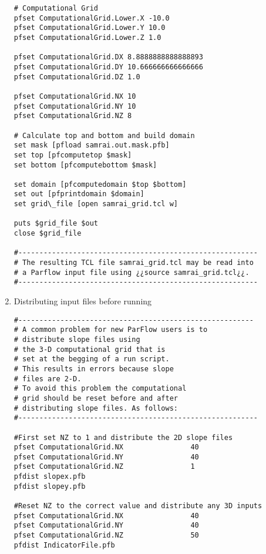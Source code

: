 \begin{enumerate}
\begin{display}
\begin{verbatim}
# Computational Grid
pfset ComputationalGrid.Lower.X -10.0
pfset ComputationalGrid.Lower.Y 10.0
pfset ComputationalGrid.Lower.Z 1.0

pfset ComputationalGrid.DX 8.8888888888888893
pfset ComputationalGrid.DY 10.666666666666666
pfset ComputationalGrid.DZ 1.0

pfset ComputationalGrid.NX 10
pfset ComputationalGrid.NY 10
pfset ComputationalGrid.NZ 8

# Calculate top and bottom and build domain
set mask [pfload samrai.out.mask.pfb]
set top [pfcomputetop $mask]
set bottom [pfcomputebottom $mask]

set domain [pfcomputedomain $top $bottom]
set out [pfprintdomain $domain]
set grid\_file [open samrai_grid.tcl w]

puts $grid_file $out
close $grid_file

#---------------------------------------------------------
# The resulting TCL file samrai_grid.tcl may be read into
# a Parflow input file using ¿¿source samrai_grid.tcl¿¿.
#---------------------------------------------------------

\end{verbatim}\end{display}
\item Distributing input files before running
\label{dist example}
\begin{display}\begin{verbatim}
#--------------------------------------------------------
# A common problem for new ParFlow users is to 
# distribute slope files using 
# the 3-D computational grid that is
# set at the begging of a run script. 
# This results in errors because slope 
# files are 2-D. 
# To avoid this problem the computational 
# grid should be reset before and after
# distributing slope files. As follows:
#---------------------------------------------------------

#First set NZ to 1 and distribute the 2D slope files
pfset ComputationalGrid.NX                40 
pfset ComputationalGrid.NY                40 
pfset ComputationalGrid.NZ                1
pfdist slopex.pfb
pfdist slopey.pfb

#Reset NZ to the correct value and distribute any 3D inputs
pfset ComputationalGrid.NX                40 
pfset ComputationalGrid.NY                40 
pfset ComputationalGrid.NZ                50 
pfdist IndicatorFile.pfb

\end{verbatim}\end{display}


\end{enumerate}
